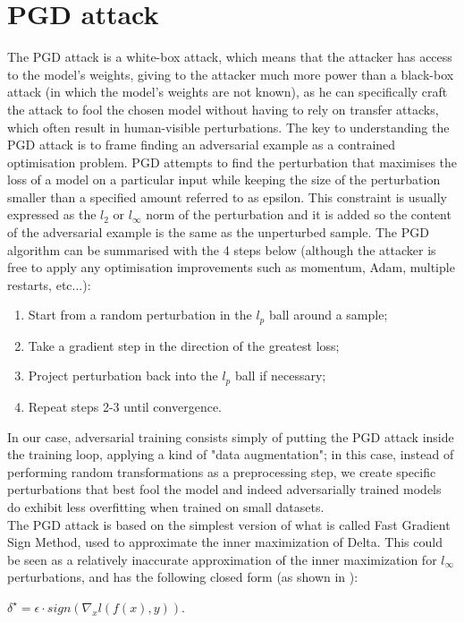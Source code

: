 \documentclass{article}
\begin{document}
\section{PGD attack}
The PGD attack is a white-box attack, which means that the attacker has access to the model's weights, giving to the attacker much more power than a black-box attack (in which the model's weights are not known), as he can specifically craft the attack to fool the chosen model without having to rely on transfer attacks, which often result in human-visible perturbations.
The key to understanding the PGD attack is to frame finding an adversarial example as a contrained optimisation problem. PGD attempts to find the perturbation that maximises the loss of a model on a particular input while keeping the size of the perturbation smaller than a specified amount referred to as epsilon. This constraint is usually expressed as the $l_2$ or $l_{\infty}$ norm of the perturbation and it is added so the content of the adversarial example is the same as the unperturbed sample.
The PGD algorithm can be summarised with the 4 steps below (although the attacker is free to apply any optimisation improvements such as momentum, Adam, multiple restarts, etc...):
\begin{enumerate}
	\item Start from a random perturbation in the $l_p$ ball around a sample;
	\item Take a gradient step in the direction of the greatest loss;
	\item Project perturbation back into the $l_p$ ball if necessary;
	\item Repeat steps 2-3 until convergence.
\end{enumerate}
In our case, adversarial training consists simply of putting the PGD attack inside the training loop, applying a kind of "data augmentation"; in this case, instead of performing random transformations as a preprocessing step, we create specific perturbations that best fool the model and indeed adversarially trained models do exhibit less overfitting when trained on small datasets.\\
The PGD attack is based on the simplest version of what is called Fast Gradient Sign Method, used to approximate the inner maximization of Delta. This could be seen as a relatively inaccurate approximation of the inner maximization for $l_{\infty}$ perturbations, and has the following closed form (as shown in \cite{GoodfellowEtAl2014}):
\begin{center}
	$\delta^{\star} = \epsilon \cdot sign(\nabla_{x}l(f(x), y))$.
\end{center}
\end{document}
